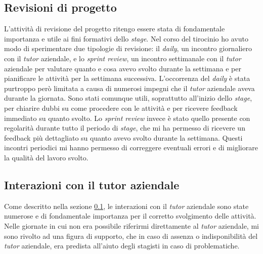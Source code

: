 \subsection{Revisioni di progetto} \label{sec:revisioni}
L'attività di revisione del progetto ritengo essere stata di fondamentale importanza e utile ai fini formativi dello \textit{stage}.
Nel corso del tirocinio ho avuto modo di sperimentare due tipologie di revisione: il \textit{daily}, un incontro giornaliero con il \textit{tutor} aziendale, e lo \textit{sprint review}, un incontro settimanale con il \textit{tutor} aziendale per valutare quanto e cosa avevo svolto durante la settimana e per pianificare le attività per la settimana successiva.
L'occorrenza del \textit{daily} è stata purtroppo però limitata a causa di numerosi impegni che il \textit{tutor} aziendale aveva durante la giornata. Sono stati comunque utili, soprattutto all'inizio dello \textit{stage}, per chiarire dubbi su come procedere con le attività e per ricevere feedback immediato su quanto svolto.
Lo \textit{sprint review} invece è stato quello presente con regolarità durante tutto il periodo di \textit{stage}, che mi ha permesso di ricevere un feedback più dettagliato su quanto avevo svolto durante la settimana. Questi incontri periodici mi hanno permesso di correggere eventuali errori e di migliorare la qualità del lavoro svolto.

\subsection{Interazioni con il tutor aziendale}
Come descritto nella sezione \ref{sec:revisioni}, le interazioni con il \textit{tutor} aziendale sono state numerose e di fondamentale importanza per il corretto svolgimento delle attività.
Nelle giornate in cui non era possibile riferirmi direttamente al \textit{tutor} aziendale, mi sono rivolto ad una figura di supporto, che in caso di assenza o indisponibilità del \textit{tutor} aziendale, era predista all'aiuto degli stagisti in caso di problematiche.


